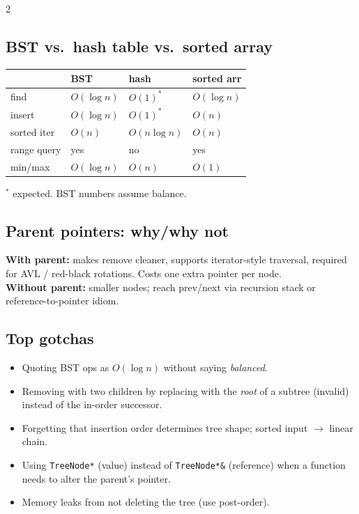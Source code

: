 \documentclass[10pt]{article}
\begin{document}
\begin{multicols}{2}
\subsection*{BST vs.\ hash table vs.\ sorted array}
\begin{tabular}{@{}l|lll@{}}
                  & \textbf{BST} & \textbf{hash} & \textbf{sorted arr}\\
\hline
find              & $O(\log n)$  & $O(1)^*$      & $O(\log n)$\\
insert            & $O(\log n)$  & $O(1)^*$      & $O(n)$\\
sorted iter       & $O(n)$       & $O(n \log n)$ & $O(n)$\\
range query       & yes          & no            & yes\\
min/max           & $O(\log n)$  & $O(n)$        & $O(1)$
\end{tabular}
$^*$ expected. BST numbers assume balance.

\subsection*{Parent pointers: why/why not}
\textbf{With parent:} makes remove cleaner, supports iterator-style
traversal, required for AVL / red-black rotations. Costs one extra
pointer per node.\\
\textbf{Without parent:} smaller nodes; reach prev/next via recursion
stack or reference-to-pointer idiom.

\subsection*{Top gotchas}
\begin{itemize}
    \item Quoting BST ops as $O(\log n)$ without saying \emph{balanced}.
    \item Removing with two children by replacing with the \emph{root}
    of a subtree (invalid) instead of the in-order successor.
    \item Forgetting that insertion order determines tree shape;
    sorted input $\to$ linear chain.
    \item Using \texttt{TreeNode*} (value) instead of
    \texttt{TreeNode*\&} (reference) when a function needs to alter
    the parent's pointer.
    \item Memory leaks from not deleting the tree (use post-order).
\end{itemize}

\end{multicols}
\end{document}

